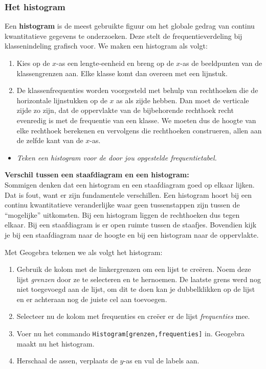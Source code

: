 \documentclass[11pt]{article}
\newcommand{\vraag}[2]{\begin{itemize}\item {\it #1} \vspace*{#2}\end{itemize}}
\begin{document}
\subsubsection{Het histogram}

Een {\bf histogram} is de meest gebruikte figuur om het globale gedrag van continu
kwantitatieve gegevens te onderzoeken. Deze stelt de frequentieverdeling bij klassenindeling
grafisch voor. We maken een histogram als volgt:

\begin{enumerate}
  \item Kies op de $x$-as een lengte-eenheid en breng op de $x$-as de beeldpunten van de klassengrenzen aan. Elke klasse komt dan overeen met een lijnstuk.
  \item De klassenfrequenties worden voorgesteld met behulp van rechthoeken die de horizontale lijnstukken op de $x$ as als zijde hebben. Dan moet de verticale zijde zo zijn, dat de oppervlakte van de bijbehorende rechthoek recht evenredig is met de frequentie van een klasse. We moeten dus de hoogte van elke rechthoek berekenen en vervolgens die rechthoeken construeren, allen aan de zelfde kant van de $x$-as.
\end{enumerate}

\vraag{Teken een histogram voor de door jou opgestelde frequentietabel.}{0cm}

\begin{center}
  
\end{center}

{\bf Verschil tussen een staafdiagram en een histogram:}\\
Sommigen denken dat een histogram en een staafdiagram goed op elkaar
lijken. Dat is fout, want er zijn fundamentele verschillen. Een histogram hoort
bij een continu kwantitatieve veranderlijke waar geen tussenstappen zijn tussen
de “mogelijke” uitkomsten. Bij een histogram liggen de rechthoeken dus tegen
elkaar. Bij een staafdiagram is er open ruimte tussen de staafjes. Bovendien
kijk je bij een staafdiagram naar de hoogte en bij een histogram naar de
oppervlakte.

Met Geogebra tekenen we als volgt het histogram:
\begin{enumerate}
  \item Gebruik de kolom met de linkergrenzen om een lijst te creëren. Noem deze lijst {\it grenzen} door ze te selecteren en te hernoemen. De laatste grens werd nog niet toegevoegd aan de lijst, om dit te doen kan je dubbelklikken op de lijst en er achteraan nog de juiste cel aan toevoegen.
  \item Selecteer nu de kolom met frequenties en creëer er de lijst {\it frequenties} mee.
  \item Voer nu het commando \verb#Histogram[grenzen,frequenties]# in. Geogebra maakt nu het histogram.
  \item Herschaal de assen, verplaats de $y$-as en vul de labels aan.
\end{enumerate}
\end{document}
